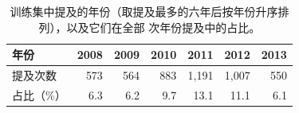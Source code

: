 \begin{table}[t]
\centering
\scriptsize
\caption{训练集中提及的年份（取提及最多的六年后按年份升序排列），以及它们在全部 \resultYearTotal{} 次年份提及中的占比。}
\label{tab:years}
\begin{tabular}{lrrrrrr}
\toprule
年份 & 2008 & 2009 & 2010 & 2011 & 2012 & 2013 \\
\midrule
提及次数 & 573 & 564 & 883 & 1,191 & 1,007 & 550 \\
占比（\%） & 6.3 & 6.2 & 9.7 & 13.1 & 11.1 & 6.1 \\
\bottomrule
\end{tabular}
\end{table}
